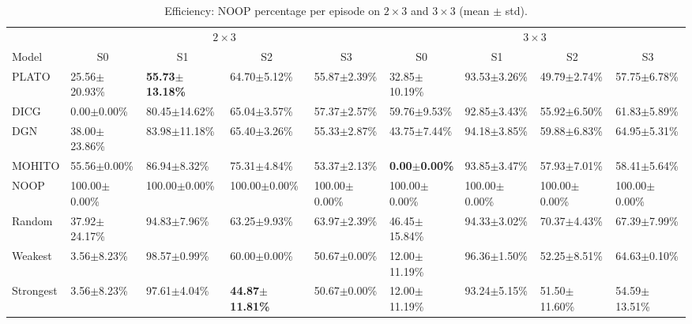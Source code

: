 \begin{table}[!t]
\centering
\small
\setlength{\tabcolsep}{1.4pt}
\renewcommand{\arraystretch}{1.02}
\begin{tabular}{@{\hspace{2pt}}l|l|l|l|l||l|l|l|l@{\hspace{2pt}}}
\toprule
& \multicolumn{4}{c||}{$2\times 3$} & \multicolumn{4}{c}{$3\times 3$} \\
\cmidrule(lr){2-5}\cmidrule(lr){6-9}
Model & \multicolumn{1}{c|}{S0} & \multicolumn{1}{c|}{S1} & \multicolumn{1}{c|}{S2} & \multicolumn{1}{c||}{S3}
      & \multicolumn{1}{c|}{S0} & \multicolumn{1}{c|}{S1} & \multicolumn{1}{c|}{S2} & \multicolumn{1}{c}{S3} \\
\midrule

PLATO & 25.56$\pm$20.93\% & \textbf{55.73$\pm$13.18\%} & 64.70$\pm$5.12\% & 55.87$\pm$2.39\%
    & 32.85$\pm$10.19\% & 93.53$\pm$3.26\% & 49.79$\pm$2.74\% & 57.75$\pm$6.78\% \\
DICG & 0.00$\pm$0.00\% & 80.45$\pm$14.62\% & 65.04$\pm$3.57\% & 57.37$\pm$2.57\%
    & 59.76$\pm$9.53\% & 92.85$\pm$3.43\% & 55.92$\pm$6.50\% & 61.83$\pm$5.89\% \\
DGN & 38.00$\pm$23.86\% & 83.98$\pm$11.18\% & 65.40$\pm$3.26\% & 55.33$\pm$2.87\%
    & 43.75$\pm$7.44\% & 94.18$\pm$3.85\% & 59.88$\pm$6.83\% & 64.95$\pm$5.31\% \\
MOHITO  & 55.56$\pm$0.00\% & 86.94$\pm$8.32\% & 75.31$\pm$4.84\% & 53.37$\pm$2.13\%
    & \textbf{0.00$\pm$0.00\%} & 93.85$\pm$3.47\% & 57.93$\pm$7.01\% & 58.41$\pm$5.64\% \\
NOOP & 100.00$\pm$0.00\% & 100.00$\pm$0.00\% & 100.00$\pm$0.00\% & 100.00$\pm$0.00\%
    & 100.00$\pm$0.00\% & 100.00$\pm$0.00\% & 100.00$\pm$0.00\% & 100.00$\pm$0.00\% \\
Random  & 37.92$\pm$24.17\% & 94.83$\pm$7.96\% & 63.25$\pm$9.93\% & 63.97$\pm$2.39\%
    & 46.45$\pm$15.84\% & 94.33$\pm$3.02\% & 70.37$\pm$4.43\% & 67.39$\pm$7.99\% \\
Weakest & 3.56$\pm$8.23\% & 98.57$\pm$0.99\% & 60.00$\pm$0.00\% & 50.67$\pm$0.00\%
    & 12.00$\pm$11.19\% & 96.36$\pm$1.50\% & 52.25$\pm$8.51\% & 64.63$\pm$0.10\% \\
Strongest & 3.56$\pm$8.23\% & 97.61$\pm$4.04\% & \textbf{44.87$\pm$11.81\%} & 50.67$\pm$0.00\%
    & 12.00$\pm$11.19\% & 93.24$\pm$5.15\% & 51.50$\pm$11.60\% & 54.59$\pm$13.51\% \\

\bottomrule
\end{tabular}
\caption{Efficiency: NOOP percentage per episode on $2\times 3$ and $3\times 3$ (mean $\pm$ std).}
\label{tab:noop_2x3_3x3}
\end{table}


